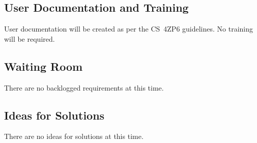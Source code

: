 \documentclass[12pt, titlepage]{article}
\begin{document}
\subsection{User Documentation and Training}
User documentation will be created as per the CS~4ZP6 guidelines.  No training will be required.
\subsection{Waiting Room}
There are no backlogged requirements at this time.  
\subsection{Ideas for Solutions}
There are no ideas for solutions at this time.  
\end{document}
